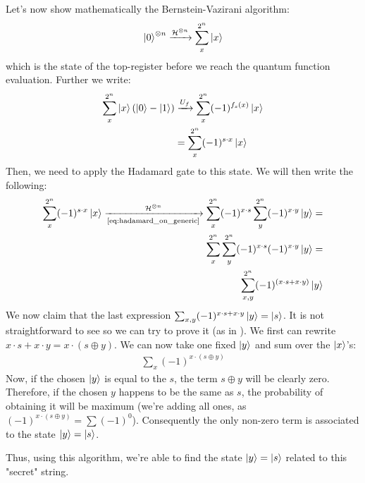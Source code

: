 Let's now show mathematically the Bernstein-Vazirani algorithm:
\begin{align}
  \ket{0}^{\otimes n} \xrightarrow{\mathcal{H}^{\otimes n}} \sum_x^{2^n} \ket{x}
\end{align}
which is the state of the top-register before we reach the quantum function evaluation. Further we write:
\begin{align}
  \sum_x^{2^n} \ket{x}(\ket{0}-\ket{1}) &\xrightarrow{U_f} \sum_x^{2^n} (-1)^{f_s(x)}\ket{x} \\ 
                                        &=\sum_x^{2^n} (-1)^{s\cdot x} \ket{x} 
\end{align}
Then, we need to apply the Hadamard gate to this state. We will then write the following:
\begin{align}
  \sum_x^{2^n} (-1)^{s\cdot x} \ket{x} \xrightarrow[\text{\autoref{eq:hadamard_on_generic}}]{\mathcal{H}^{\otimes n}} \sum_x^{2^n} (-1)^{x\cdot s} 
  \sum_y^{2^n} (-1)^{x \cdot y} \ket{y} =\\
\sum_x^{2^n} \sum_y^{2^n} (-1)^{x\cdot s} (-1)^{x \cdot y} \ket{y} =\\
\sum_{x,y}^{2^n} (-1)^{(x\cdot s + x\cdot y)} \ket{y}
\end{align}
We now claim that the last expression $\sum_{x,y} (-1)^{x\cdot s + x\cdot y}\ket{y} = \ket{s}$. It is not straightforward to see so we can try to prove it (as
in \cite{noauthor_bernsteinvazirani_2022}).
We first can rewrite $x\cdot s + x\cdot y=x\cdot (s\oplus y)$. 
We can now take one fixed $\ket{y}$ and sum over the $\ket{x}$'s:
\begin{align}
  \sum_{x} (-1)^{x \cdot (s \oplus y)}
\end{align}
Now, if the chosen $\ket{y}$ is equal to the $s$, the term $s\oplus y$ will be clearly zero. Therefore, if the chosen $y$ 
happens to be the same as $s$, the probability of obtaining it will be maximum (we're adding all ones, as $(-1)^{x\cdot(s\oplus y)} = \sum (-1)^{0}$).
Consequently the only non-zero term is associated to the state $\ket{y}=\ket{s}$.

Thus, using this algorithm, we're able to find the state $\ket{y}=\ket{s}$ related to this "secret" string.

